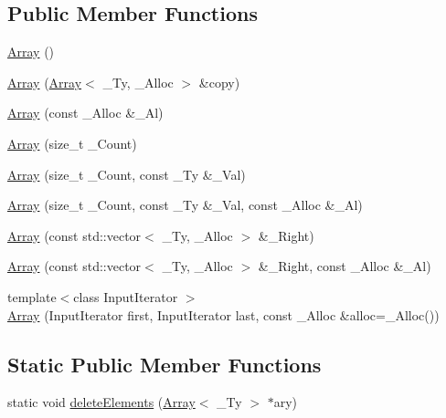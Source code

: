 \subsection*{Public Member Functions}
\begin{DoxyCompactItemize}
\item 
\mbox{\hyperlink{class_rad_j_a_v_1_1_array_a1a0ac18cbeb2d1075e527f08ce62e071}{Array}} ()
\item 
\mbox{\hyperlink{class_rad_j_a_v_1_1_array_ae78990d26916c773be8bb068665c8994}{Array}} (\mbox{\hyperlink{class_rad_j_a_v_1_1_array}{Array}}$<$ \+\_\+\+Ty, \+\_\+\+Alloc $>$ \&copy)
\item 
\mbox{\hyperlink{class_rad_j_a_v_1_1_array_af317ba608afaa4c4de550dc3d3541680}{Array}} (const \+\_\+\+Alloc \&\+\_\+\+Al)
\item 
\mbox{\hyperlink{class_rad_j_a_v_1_1_array_a68fc170aa12175c2229df3f9ac3444bf}{Array}} (size\+\_\+t \+\_\+\+Count)
\item 
\mbox{\hyperlink{class_rad_j_a_v_1_1_array_a4a577ea07f40364674bbc60967214d7f}{Array}} (size\+\_\+t \+\_\+\+Count, const \+\_\+\+Ty \&\+\_\+\+Val)
\item 
\mbox{\hyperlink{class_rad_j_a_v_1_1_array_a11794fb3845651b5a471a14557e35ab0}{Array}} (size\+\_\+t \+\_\+\+Count, const \+\_\+\+Ty \&\+\_\+\+Val, const \+\_\+\+Alloc \&\+\_\+\+Al)
\item 
\mbox{\hyperlink{class_rad_j_a_v_1_1_array_a1940daea9fd0bdb59bc2d872613ba28c}{Array}} (const std\+::vector$<$ \+\_\+\+Ty, \+\_\+\+Alloc $>$ \&\+\_\+\+Right)
\item 
\mbox{\hyperlink{class_rad_j_a_v_1_1_array_a657a17cc80f13bc88f89a43649628c53}{Array}} (const std\+::vector$<$ \+\_\+\+Ty, \+\_\+\+Alloc $>$ \&\+\_\+\+Right, const \+\_\+\+Alloc \&\+\_\+\+Al)
\item 
{\footnotesize template$<$class Input\+Iterator $>$ }\\\mbox{\hyperlink{class_rad_j_a_v_1_1_array_aac531787851622f2bb7816c80aae36bd}{Array}} (Input\+Iterator first, Input\+Iterator last, const \+\_\+\+Alloc \&alloc=\+\_\+\+Alloc())
\end{DoxyCompactItemize}
\subsection*{Static Public Member Functions}
\begin{DoxyCompactItemize}
\item 
static void \mbox{\hyperlink{class_rad_j_a_v_1_1_array_a7b063e96bb17fc2433fc4fe069d9a3e4}{delete\+Elements}} (\mbox{\hyperlink{class_rad_j_a_v_1_1_array}{Array}}$<$ \+\_\+\+Ty $>$ $\ast$ary)
\end{DoxyCompactItemize}


